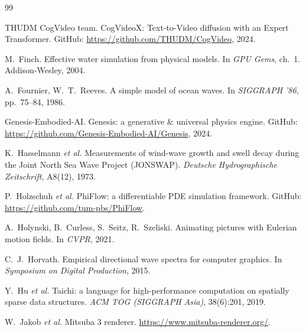 \documentclass[11pt,a4paper]{article}
\begin{document}
\begingroup
\renewcommand{\section}[2]{}
\begin{thebibliography}{99}\small

THUDM CogVideo team.
\newblock CogVideoX: Text-to-Video diffusion with an Expert Transformer.
\newblock GitHub: \url{https://github.com/THUDM/CogVideo}, 2024.

M.~Finch.
\newblock Effective water simulation from physical models.
\newblock In \emph{GPU Gems}, ch.~1. Addison-Wesley, 2004.

A.~Fournier, W.~T.~Reeves.
\newblock A simple model of ocean waves.
\newblock In \emph{SIGGRAPH '86}, pp.~75--84, 1986.

Genesis-Embodied-AI.
\newblock Genesis: a generative \& universal physics engine.
\newblock GitHub: \url{https://github.com/Genesis-Embodied-AI/Genesis},
  2024.

K.~Hasselmann \emph{et al.}
\newblock Measurements of wind-wave growth and swell decay during the
Joint North Sea Wave Project (JONSWAP).
\newblock \emph{Deutsche Hydrographische Zeitschrift}, A8(12), 1973.

P.~Holzschuh \emph{et al.}
\newblock PhiFlow: a differentiable PDE simulation framework.
\newblock GitHub: \url{https://github.com/tum-pbs/PhiFlow}.

A.~Holynski, B.~Curless, S.~Seitz, R.~Szeliski.
\newblock Animating pictures with Eulerian motion fields.
\newblock In \emph{CVPR}, 2021.

C.~J.~Horvath.
\newblock Empirical directional wave spectra for computer graphics.
\newblock In \emph{Symposium on Digital Production}, 2015.

Y.~Hu \emph{et al.}
\newblock Taichi: a language for high-performance computation on
spatially sparse data structures.
\newblock \emph{ACM TOG (SIGGRAPH Asia)}, 38(6):201, 2019.

W.~Jakob \emph{et al.}
\newblock Mitsuba 3 renderer.
\newblock \url{https://www.mitsuba-renderer.org/}.


\end{thebibliography}
\end{document}

